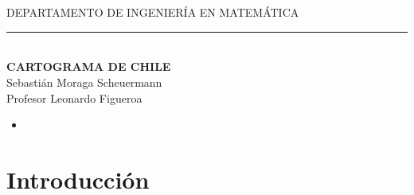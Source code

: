 \documentclass[20pt]{report}
\begin{document}
\begin{center}
\\
\\

{DEPARTAMENTO DE INGENIER\'IA EN MATEM\'ATICA}
\end{center}
\begin{center}
\noindent\rule{15cm}{.5pt}\\
\vspace{2cm}
\textbf{\Large{ CARTOGRAMA	 DE CHILE}}\\

\Large{Sebasti\'an Moraga Scheuermann}\\

\Large{Profesor Leonardo Figueroa}\\

\end{center}



 \vspace{.2cm}
  \noindent
\begin{itemize}
\item [\bf ]{\bf    }
\topmargin=-1.6cm


\end{itemize}
\topmargin=-1.6cm
\vspace{3cm}
\noindent 






\pagebreak


 \tableofcontents %


\chapter{Introducci\'on}\label{cap.introduccion}
\end{document}
